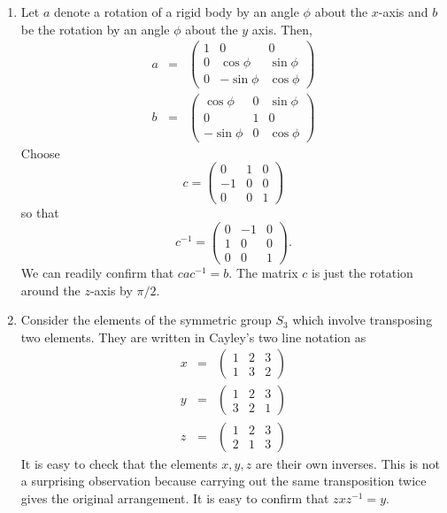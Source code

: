 \documentclass{article}
\theoremstyle{plain}
\numberwithin{thm}{section}
\theoremstyle{plain}
\numberwithin{prop}{section}
\theoremstyle{definition}
\numberwithin{defn}{section}
\theoremstyle{remark}
\numberwithin{equation}{section}
\begin{document}
\begin{enumerate}
\item
Let $a$ denote a rotation of a rigid body by an angle $\phi$ about the $x$-axis
and $b$ be the rotation by an angle $\phi$ about the $y$ axis. Then,
\begin{eqnarray}
a &=& \begin{pmatrix}1 & 0 & 0 \\ 0 & \cos\phi & \sin\phi \\
0 & -\sin\phi & \cos\phi\end{pmatrix} \label{s2e1} \\
b &=& \begin{pmatrix} \cos\phi & 0 & \sin\phi \\ 0 & 1 & 0 \\
-\sin\phi  & 0 & \cos\phi\end{pmatrix} \label{s2e2} 
\end{eqnarray}
Choose
\begin{equation}\label{s2e3}
c = \begin{pmatrix}0 & 1 & 0 \\ -1 & 0 & 0 \\ 0 & 0 & 1\end{pmatrix}
\end{equation}
so that
\begin{equation}\label{s2e4}
c^{-1} = \begin{pmatrix}0 & -1 & 0 \\ 1 & 0 & 0 \\ 0 & 0 & 1\end{pmatrix}.
\end{equation}
We can readily confirm that $cac^{-1} = b$. The matrix $c$ is just the
rotation around the $z$-axis by $\pi/2$.

\item Consider the elements of the symmetric group $S_3$ which involve 
transposing two elements. They are written in Cayley's two line notation as
\begin{eqnarray}
x &=& \begin{pmatrix}1 & 2 & 3 \\ 1 & 3 & 2 \end{pmatrix} \label{s2e5} \\
y &=& \begin{pmatrix}1 & 2 & 3 \\ 3 & 2 & 1 \end{pmatrix} \label{s2e6} \\
z &=& \begin{pmatrix}1 & 2 & 3 \\ 2 & 1 & 3 \end{pmatrix} \label{s2e7}
\end{eqnarray}
It is easy to check that the elements $x, y, z$ are their own inverses. This
is not a surprising observation because carrying out the same transposition
twice gives the original arrangement. It is easy to confirm that $zxz^{-1} = y$.
\end{enumerate}
\end{document}
